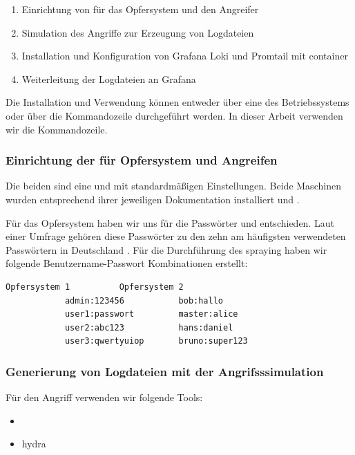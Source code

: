 \begin{enumerate}[noitemsep]
   \item Einrichtung von  für das Opfersystem und den Angreifer
   \item Simulation des Angriffe zur Erzeugung von Logdateien
   \item Installation und Konfiguration von Grafana Loki und Promtail mit \gls{container}
   \item Weiterleitung der Logdateien an Grafana
\end{enumerate}

Die Installation und Verwendung können entweder über eine  des Betriebssystems oder über die Kommandozeile durchgeführt werden. In dieser Arbeit verwenden wir die Kommandozeile.

\subsubsection{Einrichtung der  für Opfersystem und Angreifen}
Die beiden  sind eine  und  mit standardmäßigen Einstellungen. Beide Maschinen wurden entsprechend ihrer jeweiligen Dokumentation installiert \citep{kali_vm} und \citep{Ubuntu_server}.

Für das Opfersystem haben wir uns für die Passwörter  und  entschieden. Laut einer Umfrage gehören diese Passwörter zu den zehn am häufigsten verwendeten Passwörtern in Deutschland \citep{silicon_passwort}. Für die Durchführung des \gls{spraying} haben wir folgende Benutzername-Passwort Kombinationen erstellt:

{
\begin{lstlisting}[frame=single]
            Opfersystem 1          Opfersystem 2
            admin:123456           bob:hallo
            user1:passwort         master:alice
            user2:abc123           hans:daniel
            user3:qwertyuiop       bruno:super123
\end{lstlisting}
}

\newpage
\subsubsection{Generierung von Logdateien mit der Angrifsssimulation}
Für den Angriff verwenden wir folgende Tools:

{
\begin{itemize}[noitemsep]
   \item	{}
   \item \gls{hydra}
\end{itemize}
}

